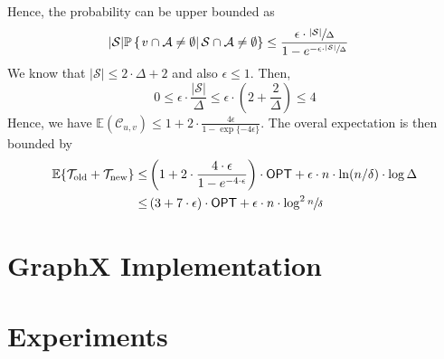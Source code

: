 \documentclass{article} %
\newcommand{\OPT}{\mathsf{OPT}}
\renewcommand{\Pr}{\mathbb{P}}
\begin{document}
Hence, the probability can be upper bounded as
\begin{align*}
|\mathcal{S}|\Pr\left\{
\left.v \cap \mathcal{A} \neq\emptyset\right|  \mathcal{S}\cap\mathcal{A} \neq\emptyset
\right\} 
&\le \frac{\epsilon\cdot \sfrac{|\mathcal{S}|}{\Delta}}{1-e^{-\epsilon\cdot \sfrac{|\mathcal{S}|}{\Delta}}}
\end{align*}
We know that $|\mathcal{S}|\le 2\cdot\Delta+2$ and also $\epsilon\le 1$.
Then, 
$$0\le \epsilon\cdot \frac{|\mathcal{S}|}{\Delta}\le\epsilon\cdot \left(2+\frac{2}{\Delta}\right)\le 4 $$
Hence, we have $\mathbb{E}(\mathcal{C}_{u,v}) \leq 1 + 2\cdot \frac{4\epsilon}{1-\exp\{-4\epsilon\}}$.
The overal expectation is then bounded by
\begin{align*}
\mathbb{E}\{\mathcal{T}_\text{old} + \mathcal{T}_\text{new}\}
\le& \left(1+2\cdot \frac{4\cdot \epsilon }{1-e^{-4\cdot \epsilon}}\right)\cdot \OPT+\epsilon\cdot n\cdot \ln(n/\delta)\cdot \log\Delta \\
\le& \left(3+7\cdot\epsilon\right)\cdot \OPT+\epsilon\cdot n\cdot \log^2\sfrac{n}{\delta}
\end{align*}


%



%
%

\section{GraphX Implementation}

\section{Experiments}
\end{document}
